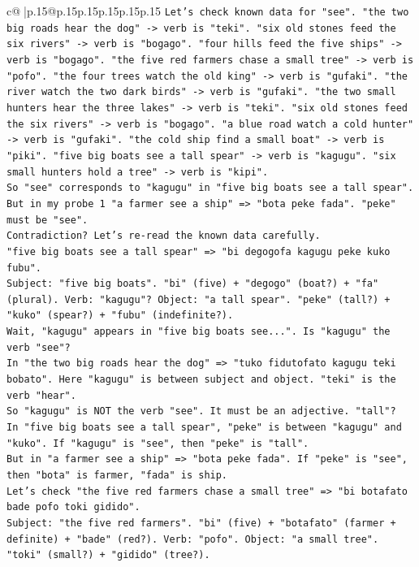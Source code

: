 \documentclass{article}
\begin{document}
{\begin{supertabular}{c@{$\;$}|p{.15\linewidth}@{}p{.15\linewidth}p{.15\linewidth}p{.15\linewidth}p{.15\linewidth}p{.15\linewidth}}
{{{\texttt{Let's check known data for "see". "the two big roads hear the dog" {-}> verb is "teki". "six old stones feed the six rivers" {-}> verb is "bogago". "four hills feed the five ships" {-}> verb is "bogago". "the five red farmers chase a small tree" {-}> verb is "pofo". "the four trees watch the old king" {-}> verb is "gufaki". "the river watch the two dark birds" {-}> verb is "gufaki". "the two small hunters hear the three lakes" {-}> verb is "teki". "six old stones feed the six rivers" {-}> verb is "bogago". "a blue road watch a cold hunter" {-}> verb is "gufaki". "the cold ship find a small boat" {-}> verb is "piki". "five big boats see a tall spear" {-}> verb is "kagugu". "six small hunters hold a tree" {-}> verb is "kipi".} \\
\texttt{So "see" corresponds to "kagugu" in "five big boats see a tall spear".} \\
\texttt{But in my probe 1 "a farmer see a ship" => "bota peke fada". "peke" must be "see".} \\
\texttt{Contradiction? Let's re{-}read the known data carefully.} \\
\texttt{"five big boats see a tall spear" => "bi degogofa kagugu peke kuko fubu".} \\
\texttt{Subject: "five big boats". "bi" (five) + "degogo" (boat?) + "fa" (plural). Verb: "kagugu"? Object: "a tall spear". "peke" (tall?) + "kuko" (spear?) + "fubu" (indefinite?).} \\
\texttt{Wait, "kagugu" appears in "five big boats see...". Is "kagugu" the verb "see"?} \\
\texttt{In "the two big roads hear the dog" => "tuko fidutofato kagugu teki bobato". Here "kagugu" is between subject and object. "teki" is the verb "hear".} \\
\texttt{So "kagugu" is NOT the verb "see". It must be an adjective. "tall"?} \\
\texttt{In "five big boats see a tall spear", "peke" is between "kagugu" and "kuko". If "kagugu" is "see", then "peke" is "tall".} \\
\texttt{But in "a farmer see a ship" => "bota peke fada". If "peke" is "see", then "bota" is farmer, "fada" is ship.} \\
\texttt{Let's check "the five red farmers chase a small tree" => "bi botafato bade pofo toki gidido".} \\
\texttt{Subject: "the five red farmers". "bi" (five) + "botafato" (farmer + definite) + "bade" (red?). Verb: "pofo". Object: "a small tree". "toki" (small?) + "gidido" (tree?).} \\
}}}
\end{supertabular}}
\end{document}
